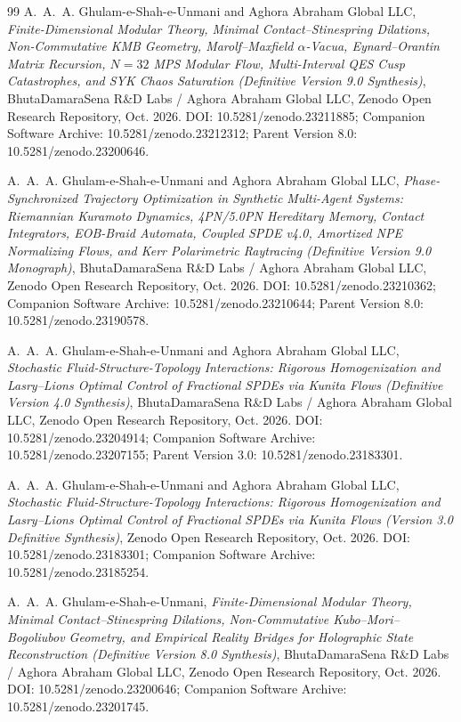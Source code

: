 \documentclass[11pt,a4paper,reqno]{article}
\def\texttt#1{#1}%
\def\zenodo#1{10.5281/zenodo.#1}%
\newcommand{\zenodo}[1]{\href{https://doi.org/10.5281/zenodo.#1}{\texttt{10.5281/\allowbreak zenodo.#1}}}
\theoremstyle{plain}
\theoremstyle{definition}
\theoremstyle{remark}
\numberwithin{equation}{section}
\begin{document}
\begin{thebibliography}{99}
A.~A.~A. Ghulam-e-Shah-e-Unmani and {Aghora Abraham Global LLC},
\emph{Finite-Dimensional Modular Theory, Minimal Contact--Stinespring Dilations, Non-Commutative KMB Geometry, Marolf--Maxfield $\alpha$-Vacua, Eynard--Orantin Matrix Recursion, $N=32$ MPS Modular Flow, Multi-Interval QES Cusp Catastrophes, and SYK Chaos Saturation (Definitive Version 9.0 Synthesis)},
BhutaDamaraSena R\&D Labs / Aghora Abraham Global LLC, Zenodo Open Research Repository, Oct. 2026.
\texttt{DOI:} \zenodo{23211885}; Companion Software Archive: \zenodo{23212312}; Parent Version 8.0: \zenodo{23200646}.

A.~A.~A. Ghulam-e-Shah-e-Unmani and {Aghora Abraham Global LLC},
\emph{Phase-Synchronized Trajectory Optimization in Synthetic Multi-Agent Systems: Riemannian Kuramoto Dynamics, 4PN/5.0PN Hereditary Memory, Contact Integrators, EOB-Braid Automata, Coupled SPDE v4.0, Amortized NPE Normalizing Flows, and Kerr Polarimetric Raytracing (Definitive Version 9.0 Monograph)},
BhutaDamaraSena R\&D Labs / Aghora Abraham Global LLC, Zenodo Open Research Repository, Oct. 2026.
\texttt{DOI:} \zenodo{23210362}; Companion Software Archive: \zenodo{23210644}; Parent Version 8.0: \zenodo{23190578}.

A.~A.~A. Ghulam-e-Shah-e-Unmani and {Aghora Abraham Global LLC},
\emph{Stochastic Fluid-Structure-Topology Interactions: Rigorous Homogenization and Lasry--Lions Optimal Control of Fractional SPDEs via Kunita Flows (Definitive Version 4.0 Synthesis)},
BhutaDamaraSena R\&D Labs / Aghora Abraham Global LLC, Zenodo Open Research Repository, Oct. 2026.
\texttt{DOI:} \zenodo{23204914}; Companion Software Archive: \zenodo{23207155}; Parent Version 3.0: \zenodo{23183301}.

A.~A.~A. Ghulam-e-Shah-e-Unmani and {Aghora Abraham Global LLC},
\emph{Stochastic Fluid-Structure-Topology Interactions: Rigorous Homogenization and Lasry--Lions Optimal Control of Fractional SPDEs via Kunita Flows (Version 3.0 Definitive Synthesis)},
Zenodo Open Research Repository, Oct. 2026.
\texttt{DOI:} \zenodo{23183301}; Companion Software Archive: \zenodo{23185254}.

A.~A.~A. Ghulam-e-Shah-e-Unmani,
\emph{Finite-Dimensional Modular Theory, Minimal Contact--Stinespring Dilations, Non-Commutative Kubo--Mori--Bogoliubov Geometry, and Empirical Reality Bridges for Holographic State Reconstruction (Definitive Version 8.0 Synthesis)},
BhutaDamaraSena R\&D Labs / Aghora Abraham Global LLC, Zenodo Open Research Repository, Oct. 2026.
\texttt{DOI:} \zenodo{23200646}; Companion Software Archive: \zenodo{23201745}.


\end{thebibliography}
\end{document}
